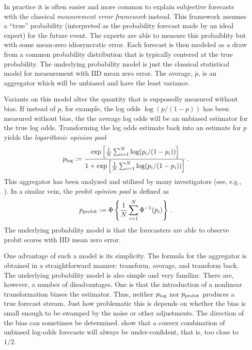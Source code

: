 \documentclass[11pt]{article}
\theoremstyle{definition}
\theoremstyle{definition}
\def\pb{\overline{p}}
\def\probit{p_{\rm probit}}
\def\plog{p_{\rm log}}
\begin{document}
In practice it is often easier and more common to explain subjective
forecasts with the classical {\em measurement error framework}
instead.  This framework assumes a ``true'' probability (interpreted
as the probability forecast made by an ideal expert) for the future 
event.  The experts are able to measure this probaiblity but with
some mean-zero idiosyncratic error.  Each forecast is then modeled
as a draw from a common probability distribution that is typically 
centered at the true probability.  
%
The underlying probability model is just the classical statistical
model for measurement with IID mean zero error.  The average, $\pb$,
is an aggregator which will be unbiased and have the least variance.

Variants on this model alter the quantity that is supposedly 
measured without bias.  If instead of $p$, for example,
the log odds $\log (p/(1-p))$ has been measured without bias, 
the the average log odds will be an unbiased estimator for
the true log odds.  Transforming the log odds estimate back into
an estimate for $p$ yields the {\em logarithmic opinion pool}
$$\plog := \frac{\exp \left [ \frac{1}{N} \sum_{i=1}^N
   \log (p_i / (1-p_i)) \right ]}
{1 + \exp \left [ \frac{1}{N} \sum_{i=1}^N
   \log (p_i / (1-p_i)) \right ]} \, .$$
This aggregator has been analyzed and utilized by many investigators
(see, e.g., \citet{dawid1995coherent, Genest, bacharach1975group}).
In a similar vein, the {\em probit opinion pool} is defined as
$$\probit := \Phi \left \{ \frac{1}{N} \sum_{i=1}^N \Phi^{-1}
   (p_i) \right \} \, .$$
The underlying probability model is that the forecasters are able
to observe probit scores with IID mean zero error.

One advantage of such a model is its simplicity.  The formula
for the aggregator is obtained in a straightforward manner: 
transform, average, and transform back.  The underlying probability
model is also simple and very familiar.  There are, however, a number
of disadvantages.  One is that the introduction of a nonlinear 
transformation biases the estimator.  Thus, neither $\plog$ 
nor $\probit$ produces a true forecast stream.  Just how
problematic this is depends on whether the bias is small enough
to be swamped by the noise or other adjustments.  The direction of
the bias can sometimes be determined.  \citet{Ranjan08}
show that a convex combination of unbiased log-odds forecasts will
always be under-confident, that is, too close to $1/2$.
\end{document}
